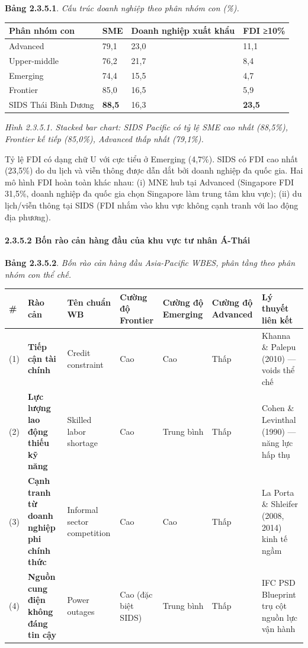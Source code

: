 \documentclass[12pt,a4paper]{article}
\begin{document}
\textbf{Bảng 2.3.5.1}. \emph{Cấu trúc doanh nghiệp theo phân nhóm con
(\%).}

\begin{longtable}[]{@{}llll@{}}
\toprule\noalign{}
Phân nhóm con & SME & Doanh nghiệp xuất khẩu & FDI ≥10\% \\
\midrule\noalign{}
\endhead
\bottomrule\noalign{}
\endlastfoot
Advanced & 79,1 & 23,0 & 11,1 \\
Upper-middle & 76,2 & 21,7 & 8,4 \\
Emerging & 74,4 & 15,5 & 4,7 \\
Frontier & 85,0 & 16,5 & 5,9 \\
SIDS Thái Bình Dương & \textbf{88,5} & 16,3 & \textbf{23,5} \\
\end{longtable}

\emph{Hình 2.3.5.1. Stacked bar chart: SIDS Pacific có tỷ lệ SME cao
nhất (88,5\%), Frontier kế tiếp (85,0\%), Advanced thấp nhất (79,1\%).}

Tỷ lệ FDI có dạng chữ U với cực tiểu ở Emerging (4,7\%). SIDS có FDI cao
nhất (23,5\%) do du lịch và viễn thông được dẫn dắt bởi doanh nghiệp đa
quốc gia. Hai mô hình FDI hoàn toàn khác nhau: (i) MNE hub tại Advanced
(Singapore FDI 31,5\%, doanh nghiệp đa quốc gia chọn Singapore làm trung
tâm khu vực); (ii) du lịch/viễn thông tại SIDS (FDI nhắm vào khu vực
không cạnh tranh với lao động địa phương).

\hypertarget{2352-bux1ed1n-ruxe0o-cux1ea3n-huxe0ng-ux111ux1ea7u-cux1ee7a-khu-vux1ef1c-tux1b0-nhuxe2n-uxe1-thuxe1i}{%
\paragraph{2.3.5.2 Bốn rào cản hàng đầu của khu vực tư nhân
Á-Thái}\label{2352-bux1ed1n-ruxe0o-cux1ea3n-huxe0ng-ux111ux1ea7u-cux1ee7a-khu-vux1ef1c-tux1b0-nhuxe2n-uxe1-thuxe1i}}

\textbf{Bảng 2.3.5.2}. \emph{Bốn rào cản hàng đầu Asia-Pacific WBES,
phân tầng theo phân nhóm con thể chế.}

\begin{longtable}[]{@{}lllllll@{}}
\toprule\noalign{}
\# & Rào cản & Tên chuẩn WB & Cường độ Frontier & Cường độ Emerging &
Cường độ Advanced & Lý thuyết liên kết \\
\midrule\noalign{}
\endhead
\bottomrule\noalign{}
\endlastfoot
(1) & \textbf{Tiếp cận tài chính} & Credit constraint & Cao & Cao & Thấp
& Khanna \& Palepu (2010) --- voids thể chế \\
(2) & \textbf{Lực lượng lao động thiếu kỹ năng} & Skilled labor shortage
& Cao & Trung bình & Thấp & Cohen \& Levinthal (1990) --- năng lực hấp
thụ \\
(3) & \textbf{Cạnh tranh từ doanh nghiệp phi chính thức} & Informal
sector competition & Cao & Cao & Thấp & La Porta \& Shleifer (2008,
2014) kinh tế ngầm \\
(4) & \textbf{Nguồn cung điện không đáng tin cậy} & Power outages & Cao
(đặc biệt SIDS) & Trung bình & Thấp & IFC PSD Blueprint trụ cột nguồn
lực vận hành \\
\end{longtable}
\end{document}
